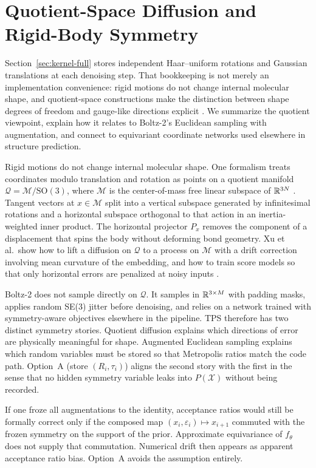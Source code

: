 \section{Quotient-Space Diffusion and Rigid-Body Symmetry}
\label{sec:quotient}

Section~\ref{sec:kernel-full} stores independent Haar--uniform rotations and
Gaussian translations at each denoising step. That bookkeeping is not merely
an implementation convenience: rigid motions do not change internal molecular
shape, and quotient-space constructions make the distinction between shape
degrees of freedom and gauge-like directions explicit \citep{xu2026quotient}.
We summarize the quotient viewpoint, explain how it relates to Boltz-2's
Euclidean sampling with augmentation, and connect to equivariant coordinate
networks used elsewhere in structure prediction.

Rigid motions do not change internal molecular shape. One formalism treats coordinates modulo translation and rotation as points on a quotient manifold $\mathcal{Q} = \mathcal{M}/\mathrm{SO}(3)$, where $\mathcal{M}$ is the center-of-mass free linear subspace of $\mathbb{R}^{3N}$ \citep{xu2026quotient,yim2023se,lin2024equivariant}. Tangent vectors at $x \in \mathcal{M}$ split into a vertical subspace generated by infinitesimal rotations and a horizontal subspace orthogonal to that action in an inertia-weighted inner product. The horizontal projector $P_x$ removes the component of a displacement that spins the body without deforming bond geometry. Xu et al.\ show how to lift a diffusion on $\mathcal{Q}$ to a process on $\mathcal{M}$ with a drift correction involving mean curvature of the embedding, and how to train score models so that only horizontal errors are penalized at noisy inputs \citep{xu2026quotient}.

Boltz-2 does not sample directly on $\mathcal{Q}$. It samples in $\mathbb{R}^{3 \times M}$ with padding masks, applies random SE(3) jitter before denoising, and relies on a network trained with symmetry-aware objectives elsewhere in the pipeline. TPS therefore has two distinct symmetry stories. Quotient diffusion explains which directions of error are physically meaningful for shape. Augmented Euclidean sampling explains which random variables must be stored so that Metropolis ratios match the code path. Option~A (store $(R_i,\tau_i)$) aligns the second story with the first in the sense that no hidden symmetry variable leaks into $P(\mathcal{X})$ without being recorded.

If one froze all augmentations to the identity, acceptance ratios would still be formally correct only if the composed map $(x_i,\varepsilon_i) \mapsto x_{i+1}$ commuted with the frozen symmetry on the support of the prior. Approximate equivariance of $f_\theta$ does not supply that commutation. Numerical drift then appears as apparent acceptance ratio bias. Option~A avoids the assumption entirely.

